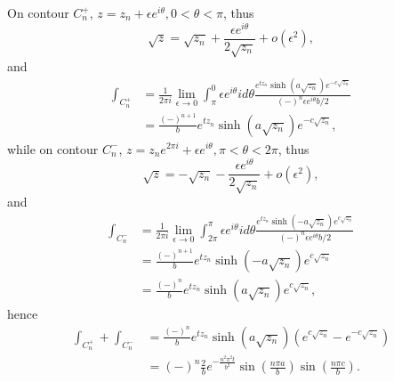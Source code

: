 On contour $C_n^+$, $z=z_n+\epsilon e^{i\theta}, 0<\theta<\pi$, thus
\[
	\sqrt{z}=\sqrt{z_n}+\frac{\epsilon e^{i\theta}}{2\sqrt{z_n}} + o(\epsilon^2),
\]
and
\begin{align*}
	\int_{C_n^+}
	&= \frac{1}{2\pi i} \lim_{\epsilon\to 0} \int_{\pi}^0 \epsilon e^{i\theta} i d\theta
	  \frac{e^{tz_n} \sinh(a\sqrt{z_n}) e^{-c\sqrt{z_n}}}
		{(-)^n \epsilon e^{i\theta} b/2}  \\
		&= \frac{(-)^{n+1}}{b} e^{tz_n} \sinh(a\sqrt{z_n}) e^{-c\sqrt{z_n}},
\end{align*}
while on contour $C_n^-$, $z=z_n e^{2\pi i}+\epsilon e^{i\theta}, \pi<\theta<2\pi$, 
thus
\[
	\sqrt{z}=-\sqrt{z_n}-\frac{\epsilon e^{i\theta}}{2\sqrt{z_n}} + o(\epsilon^2),
\]
and
\begin{align*}
	\int_{C_n^-}
	&= \frac{1}{2\pi i} \lim_{\epsilon\to 0} \int_{2\pi}^{\pi} \epsilon e^{i\theta} i d\theta
	  \frac{e^{tz_n} \sinh(-a\sqrt{z_n}) e^{c\sqrt{z_n}}}
		{(-)^{n} \epsilon e^{i\theta} b/2}  \\
		&= \frac{(-)^{n+1}}{b} e^{tz_n} \sinh(-a\sqrt{z_n}) e^{c\sqrt{z_n}} \\
		&= \frac{(-)^{n}}{b} e^{tz_n} \sinh(a\sqrt{z_n}) e^{c\sqrt{z_n}},
\end{align*}
hence
\begin{align*}
	\int_{C_n^+} + \int_{C_n^-}
	&= \frac{(-)^{n}}{b} e^{t z_n} \sinh(a\sqrt{z_n}) 
	   (e^{c\sqrt{z_n}} - e^{-c\sqrt{z_n}}) \\
		 &= (-)^n \frac{2}{b} e^{-\frac{n^2 \pi^2 t}{b^2}} \sin(\frac{n\pi a}{b}) 
        \sin(\frac{n\pi c}{b}).
\end{align*}

